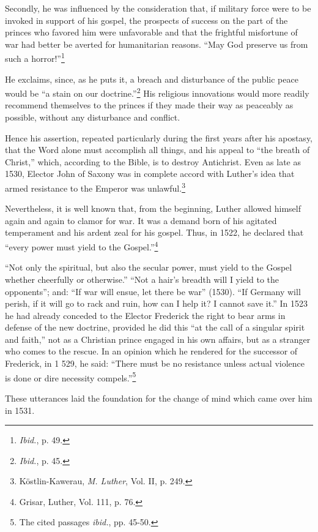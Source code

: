 Secondly, he was influenced by the consideration that, if military
force were to be invoked in support of his gospel, the prospects of
success on the part of the princes who favored him were unfavorable
and that the frightful misfortune of war had better be averted for
humanitarian reasons. “May God preserve us from such a horror!”\footnote{\textit{Ibid.}, p. 49.}

He exclaims, since, as he puts it, a breach and disturbance of the
public peace would be “a stain on our doctrine.”\footnote{\textit{Ibid.}, p. 45.}
His religious
innovations would more readily recommend themselves to the princes
if they made their way as peaceably as possible, without any disturbance
and conflict.

Hence his assertion, repeated particularly during the first years
after his apostasy, that the Word alone must accomplish all
things, and his appeal to “the breath of Christ,” which, according to
the Bible, is to destroy Antichrist. Even as late as 1530, Elector John
of Saxony was in complete accord with Luther’s idea that armed resistance
to the Emperor was unlawful.\footnote{Köstlin-Kawerau, \textit{M. Luther}, Vol. II, p. 249.}


Nevertheless, it is well known that, from the beginning, Luther
allowed himself again and again to clamor for war. It was a demand
born of his agitated temperament and his ardent zeal for his gospel.
Thus, in 1522, he declared that “every power must yield to the Gospel.”\footnote{Grisar, Luther, Vol. 111, p. 76.}

“Not only the spiritual, but also the secular power, must yield
to the Gospel whether cheerfully or otherwise.” “Not a hair’s breadth
will I yield to the opponents”; and: “If war will ensue, let there be
war” (1530). “If Germany will perish, if it will go to rack and
ruin, how can I help it? I cannot save it.” In 1523 he had already
conceded to the Elector Frederick the right to bear arms in defense
of the new doctrine, provided he did this “at the call of a singular
spirit and faith,” not as a Christian prince engaged in his own affairs,
but as a stranger who comes to the rescue. In an opinion which he rendered
for the successor of Frederick, in 1 529, he said: “There must be
no resistance unless actual violence is done or dire necessity compels.”\footnote{The cited passages \textit{ibid.}, pp. 45-50.}


These utterances laid the foundation for the change of mind which
came over him in 1531.

